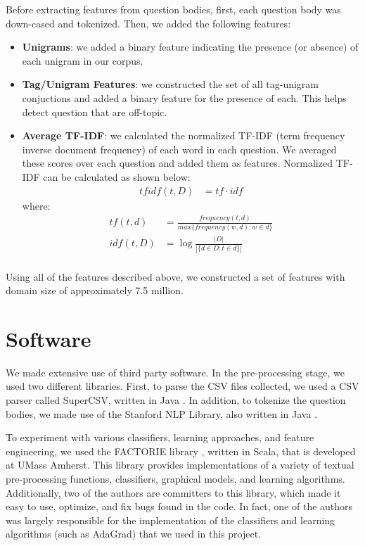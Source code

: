 \documentclass[11pt]{article}
\begin{document}
Before extracting features from question bodies, first, each question
body was down-cased and tokenized. Then, we added the following
features:

\begin{itemize}
  \item \textbf{Unigrams}: we added a binary feature indicating the
    presence (or absence) of each unigram in our corpus.
  \item \textbf{Tag/Unigram Features}: we constructed the set of all
    tag-unigram conjuctions and added a binary feature for the
    presence of each.  This helps detect question that are off-topic.
  \item \textbf{Average TF-IDF}: we calculated the normalized TF-IDF
    \cite{wiki:tfidf} (term frequency inverse document frequency) of
    each word in each question. We averaged these scores over each
    question and added them as features. Normalized TF-IDF can be
    calculated as shown below:
    \begin{align*}
            tfidf(t,D) &= tf \cdot idf
    \end{align*}
    where:
    \begin{align*}
      tf(t,d) &= \frac{frequency(t,d)}{max\{frequency(w,d):w \in d\}}\\
      idf(t,D) &= \log\frac{|D|}{|\{d \in D : t \in d \}|}\\
    \end{align*}
\end{itemize}
Using all of the features described above, we constructed a set of
features with domain size of approximately 7.5 million.

\section{Software}

We made extensive use of third party software. In the pre-processing stage, we
used two different libraries.  First, to parse the CSV files
collected, we used a CSV parser called SuperCSV, written in Java
\cite{website:supercsv}. In addition, to tokenize the question bodies,
we made use of the Stanford NLP Library, also written in Java
\cite{stanfordnlp}.

To experiment with various classifiers, learning approaches, and
feature engineering, we used the FACTORIE library
\cite{mccallum09:factorie:}, written in Scala, that is developed at
UMass Amherst.  This library provides implementations of a variety of
textual pre-processing functions, classifiers, graphical models, and
learning algorithms. Additionally, two of the authors are committers
to this library, which made it easy to use, optimize, and fix bugs
found in the code. In fact, one of the authors was largely responsible
for the implementation of the classifiers and learning algorithms
(such as AdaGrad) that we used in this project.
\end{document}
